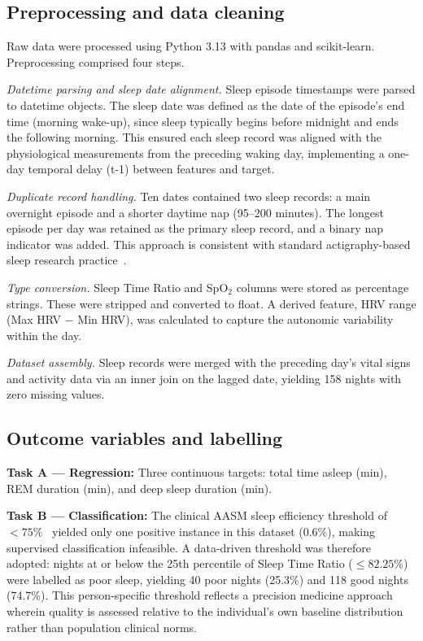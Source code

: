 \documentclass[fleqn,10pt]{wlscirep}
\begin{document}
\subsection*{Preprocessing and data cleaning}
Raw data were processed using Python 3.13 with pandas and scikit-learn. Preprocessing comprised four steps.

\textit{Datetime parsing and sleep date alignment.} Sleep episode timestamps were parsed to datetime objects. The sleep date was defined as the date of the episode's end time (morning wake-up), since sleep typically begins before midnight and ends the following morning. This ensured each sleep record was aligned with the physiological measurements from the preceding waking day, implementing a one-day temporal delay (t-1) between features and target.

\textit{Duplicate record handling.} Ten dates contained two sleep records: a main overnight episode and a shorter daytime nap (95--200 minutes). The longest episode per day was retained as the primary sleep record, and a binary nap indicator was added. This approach is consistent with standard actigraphy-based sleep research practice~\cite{rahimieichi2021}.

\textit{Type conversion.} Sleep Time Ratio and SpO$_2$ columns were stored as percentage strings. These were stripped and converted to float. A derived feature, HRV range (Max HRV $-$ Min HRV), was calculated to capture the autonomic variability within the day.

\textit{Dataset assembly.} Sleep records were merged with the preceding day's vital signs and activity data via an inner join on the lagged date, yielding 158 nights with zero missing values.

\subsection*{Outcome variables and labelling}
\noindent\textbf{Task A --- Regression:} Three continuous targets: total time asleep (min), REM duration (min), and deep sleep duration (min).
 
\noindent\textbf{Task B --- Classification:} The clinical AASM sleep efficiency threshold of $< 75\%$~\cite{aasm2017} yielded only one positive instance in this dataset (0.6\%), making supervised classification infeasible. A data-driven threshold was therefore adopted: nights at or below the 25th percentile of Sleep Time Ratio ($\leq 82.25\%$) were labelled as poor sleep, yielding 40 poor nights (25.3\%) and 118 good nights (74.7\%). This person-specific threshold reflects a precision medicine approach wherein quality is assessed relative to the individual's own baseline distribution rather than population clinical norms.
\end{document}
